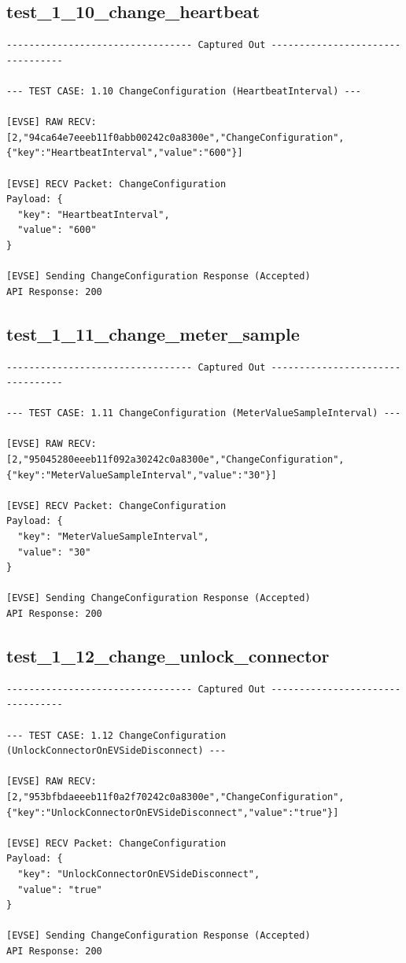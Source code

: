 \documentclass{article}
\begin{document}
\subsection*{test\_1\_10\_change\_heartbeat}
\begin{lstlisting}
--------------------------------- Captured Out ---------------------------------

--- TEST CASE: 1.10 ChangeConfiguration (HeartbeatInterval) ---

[EVSE] RAW RECV: [2,"94ca64e7eeeb11f0abb00242c0a8300e","ChangeConfiguration",{"key":"HeartbeatInterval","value":"600"}]

[EVSE] RECV Packet: ChangeConfiguration
Payload: {
  "key": "HeartbeatInterval",
  "value": "600"
}

[EVSE] Sending ChangeConfiguration Response (Accepted)
API Response: 200
\end{lstlisting}
\subsection*{test\_1\_11\_change\_meter\_sample}
\begin{lstlisting}
--------------------------------- Captured Out ---------------------------------

--- TEST CASE: 1.11 ChangeConfiguration (MeterValueSampleInterval) ---

[EVSE] RAW RECV: [2,"95045280eeeb11f092a30242c0a8300e","ChangeConfiguration",{"key":"MeterValueSampleInterval","value":"30"}]

[EVSE] RECV Packet: ChangeConfiguration
Payload: {
  "key": "MeterValueSampleInterval",
  "value": "30"
}

[EVSE] Sending ChangeConfiguration Response (Accepted)
API Response: 200
\end{lstlisting}
\subsection*{test\_1\_12\_change\_unlock\_connector}
\begin{lstlisting}
--------------------------------- Captured Out ---------------------------------

--- TEST CASE: 1.12 ChangeConfiguration (UnlockConnectorOnEVSideDisconnect) ---

[EVSE] RAW RECV: [2,"953bfbdaeeeb11f0a2f70242c0a8300e","ChangeConfiguration",{"key":"UnlockConnectorOnEVSideDisconnect","value":"true"}]

[EVSE] RECV Packet: ChangeConfiguration
Payload: {
  "key": "UnlockConnectorOnEVSideDisconnect",
  "value": "true"
}

[EVSE] Sending ChangeConfiguration Response (Accepted)
API Response: 200
\end{lstlisting}
\end{document}
